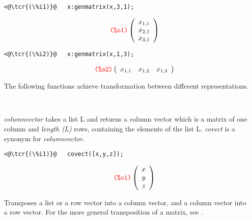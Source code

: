 \documentclass[../Maxima_Workbook.tex]{subfiles}
\begin{document}
\lz \begin{small}
\color{blue}
\begin{lstlisting}
<@\tcr{(\%i1)}@   x:genmatrix(x,3,1);
\end{lstlisting}
\vspace{-6mm} \[\tag*{\tcr{\ttfamily (\%o1)}} \left( \begin{array} {c} x_{1,1} \\ x_{2,1} \\ x_{3,1} \end{array} \right) \]
\vspace{-6mm} \begin{lstlisting}
<@\tcr{(\%i2)}@   x:genmatrix(x,1,3);
\end{lstlisting}
\vspace{-5mm} \[\tag*{\tcr{\ttfamily (\%o2)}} \left( \begin{array} {ccc} x_{1,1} & x_{1,2} & x_{1,3} \end{array} \right) \]
\color{black}
\end{small}

The following functions achieve transformation between different representations.

\lzz {} \hfill {} \\
 \hfill {}

\lz \emph{columnvector} takes a list L and returns a column vector which is a matrix of one column and \emph{length (L)} rows, containing the elements of the list L. \emph{covect} is a synonym for \emph{columnvector}.

\lz \begin{small}
\color{blue}
\begin{lstlisting}
<@\tcr{(\%i1)}@   covect([x,y,z]);
\end{lstlisting}
\vspace{-6mm} \[\tag*{\tcr{\ttfamily (\%o1)}} \left( \begin{array} {c} x \\ y \\ z \end{array} \right) \]
\color{black}
\end{small}

\lz {} \hfill \tcr{[function]}

\lz Transposes a list or a row vector into a column vector, and a column vector into a row vector. For the more general transposition of a matrix, see .
\end{document}
